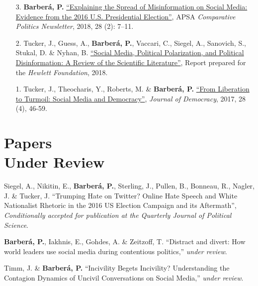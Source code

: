 \documentclass[margin,line,11pt]{resume}
\begin{document}
\begin{resume}
\begin{itemize}[leftmargin=5.5mm]
\item[3.]  \textbf{Barber\'{a}, P.} \href{http://comparativenewsletter.com/files/archived_newsletters/2018_fall.pdf}{``Explaining the Spread of Misinformation on Social Media: Evidence from the 2016 U.S. Presidential Election''}, APSA \textit{Comparative Politics Newsletter}, 2018, 28 (2): 7--11.

\item[2.]  Tucker, J., Guess, A., \textbf{Barber\'{a}, P.}, Vaccari, C., Siegel, A., Sanovich, S., Stukal, D. \& Nyhan, B. \href{https://www.hewlett.org/library/social-media-political-polarization-political-disinformation-review-scientific-literature/}{``Social Media, Political Polarization, and Political Disinformation: A Review of the Scientific Literature''}, Report prepared for the \textit{Hewlett Foundation}, 2018.   

\item[1.]  Tucker, J., Theocharis, Y., Roberts, M. \& \textbf{Barber\'{a}, P.} \href{https://muse.jhu.edu/article/671987/pdf}{``From Liberation to Turmoil: Social Media and Democracy''}, \textit{Journal of Democracy}, 2017, 28 (4), 46-59.   
\end{itemize}     
    

    \section{\mysidestyle Papers \\ Under Review} 

Siegel, A., Nikitin, E., \textbf{Barber\'{a}, P.}, Sterling, J., Pullen, B., Bonneau, R., Nagler, J. \& Tucker, J. ``Trumping Hate on Twitter? Online Hate Speech and White Nationalist Rhetoric in the 2016 US Election Campaign and its Aftermath'', \textit{Conditionally accepted for publication at the Quarterly Journal of Political Science}.

\newpage   

\textbf{Barber\'{a}, P.}, Iakhnis, E., Gohdes, A. \& Zeitzoff, T. ``Distract and divert: How world leaders use social media during contentious politics,'' \textit{under review}.

Timm, J. \& \textbf{Barber\'{a}, P.} ``Incivility Begets Incivility? Understanding the Contagion Dynamics of Uncivil Conversations on Social Media,'' \textit{under review}.


\end{resume}
\end{document}
